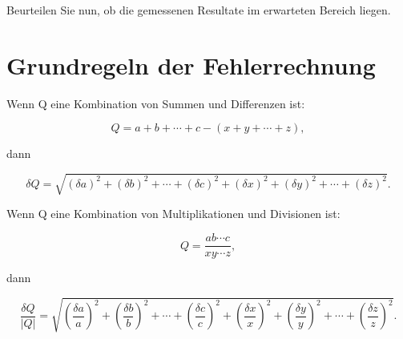 \documentclass[a4paper,10pt,oneside]{article}
\begin{document}
Beurteilen Sie nun, ob die gemessenen Resultate im erwarteten Bereich liegen.

\section{Grundregeln der Fehlerrechnung}

Wenn Q eine Kombination von Summen und Differenzen ist:

\begin{equation*}
Q = a+b+\cdots+c-(x+y+\cdots+z),
\end{equation*}

dann

\begin{equation}
\delta Q = \sqrt{(\delta a)^2+(\delta b)^2+\cdots+(\delta c)^2+(\delta x)^2+(\delta y)^2+\cdots+(\delta z)^2}.
\end{equation}

Wenn Q eine Kombination von Multiplikationen und Divisionen ist:

\begin{equation*}
Q=\frac{ab\cdots c}{xy\cdots z},
\end{equation*}

dann

\begin{equation}
\frac{\delta Q}{|Q|}=\sqrt{\left(\frac{\delta a}{a}\right)^2+\left(\frac{\delta b}{b}\right)^2+\cdots+\left(\frac{\delta c}{c}\right)^2+\left(\frac{\delta x}{x}\right)^2+\left(\frac{\delta y}{y}\right)^2+\cdots+\left(\frac{\delta z}{z}\right)^2}.
\end{equation}
\end{document}
